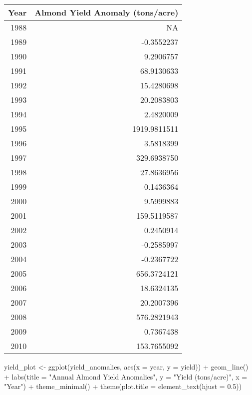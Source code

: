\documentclass[
]{article}
\newenvironment{Shaded}{\begin{snugshade}}{\end{snugshade}}
\newcommand{\AttributeTok}[1]{\textcolor[rgb]{0.77,0.63,0.00}{#1}}
\newcommand{\FloatTok}[1]{\textcolor[rgb]{0.00,0.00,0.81}{#1}}
\newcommand{\FunctionTok}[1]{\textcolor[rgb]{0.00,0.00,0.00}{#1}}
\newcommand{\NormalTok}[1]{#1}
\newcommand{\OtherTok}[1]{\textcolor[rgb]{0.56,0.35,0.01}{#1}}
\newcommand{\SpecialCharTok}[1]{\textcolor[rgb]{0.00,0.00,0.00}{#1}}
\newcommand{\StringTok}[1]{\textcolor[rgb]{0.31,0.60,0.02}{#1}}
\begin{document}
\begin{table}
\centering
\begin{tabular}{r|r}
\hline
Year & Almond Yield 
Anomaly (tons/acre)\\
\hline
1988 & NA\\
\hline
1989 & -0.3552237\\
\hline
1990 & 9.2906757\\
\hline
1991 & 68.9130633\\
\hline
1992 & 15.4280698\\
\hline
1993 & 20.2083803\\
\hline
1994 & 2.4820009\\
\hline
1995 & 1919.9811511\\
\hline
1996 & 3.5818399\\
\hline
1997 & 329.6938750\\
\hline
1998 & 27.8636956\\
\hline
1999 & -0.1436364\\
\hline
2000 & 9.5999883\\
\hline
2001 & 159.5119587\\
\hline
2002 & 0.2450914\\
\hline
2003 & -0.2585997\\
\hline
2004 & -0.2367722\\
\hline
2005 & 656.3724121\\
\hline
2006 & 18.6324135\\
\hline
2007 & 20.2007396\\
\hline
2008 & 576.2821943\\
\hline
2009 & 0.7367438\\
\hline
2010 & 153.7655092\\
\hline
\end{tabular}
\end{table}

\begin{Shaded}
\begin{Highlighting}[]
\NormalTok{yield\_plot }\OtherTok{\textless{}{-}} \FunctionTok{ggplot}\NormalTok{(yield\_anomalies, }\FunctionTok{aes}\NormalTok{(}\AttributeTok{x =}\NormalTok{ year, }\AttributeTok{y =}\NormalTok{ yield)) }\SpecialCharTok{+}
  \FunctionTok{geom\_line}\NormalTok{() }\SpecialCharTok{+}
  \FunctionTok{labs}\NormalTok{(}\AttributeTok{title =} \StringTok{"Annual Almond Yield Anomalies"}\NormalTok{, }\AttributeTok{y =} \StringTok{"Yield (tons/acre)"}\NormalTok{, }\AttributeTok{x =} \StringTok{"Year"}\NormalTok{) }\SpecialCharTok{+}
  \FunctionTok{theme\_minimal}\NormalTok{() }\SpecialCharTok{+}
  \FunctionTok{theme}\NormalTok{(}\AttributeTok{plot.title =} \FunctionTok{element\_text}\NormalTok{(}\AttributeTok{hjust =} \FloatTok{0.5}\NormalTok{))}
\end{Highlighting}
\end{Shaded}
\end{document}
